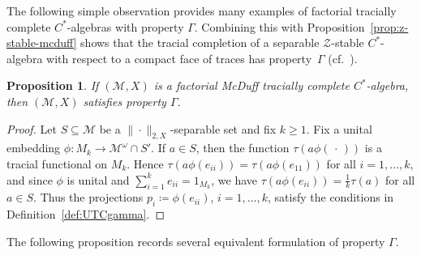 \documentclass[a4paper,11pt]{amsart}
\newtheorem{proposition}[theorem]{Proposition}
\theoremstyle{definition}
\numberwithin{equation}{section}
\numberwithin{theorem}{section}
\newcommand{\M}{\mathcal{M}}
\begin{document}
The following simple observation provides many examples of factorial tracially complete $C^*$-algebras with property $\Gamma$.  Combining this with Proposition~\ref{prop:z-stable-mcduff} shows that the tracial completion of a separable $\mathcal Z$-stable $C^*$-algebra with respect to a compact face of traces has  property~$\Gamma$ (cf.\ \cite[Proposition 2.3]{CETWW}).

\begin{proposition}\label{prop:McDuff-implies-Gamma}
If $(\M, X)$ is a factorial McDuff tracially complete $C^*$-algebra, then $(\M, X)$ satisfies property $\Gamma$.
\end{proposition}

\begin{proof}
Let $S \subseteq \M$ be a $\|\cdot\|_{2, X}$-separable set and fix $k \geq 1$.  Fix a unital embedding $\phi \colon M_k \rightarrow \M^\omega \cap S'$.  If $a \in S$, then the function $\tau(a\phi(\,\cdot\,))$ is a tracial functional on $M_k$.  Hence $\tau(a\phi(e_{ii})) = \tau(a\phi(e_{11}))$ for all $i = 1, \ldots, k$, and since $\phi$ is unital and $\sum_{i=1}^k e_{ii} = 1_{M_k}$, we have $\tau(a \phi(e_{ii})) = \frac1k \tau(a)$ for all $a \in S$.  Thus the projections $p_i \coloneqq \phi(e_{ii})$, $i = 1, \ldots, k$, satisfy the conditions in Definition~\ref{def:UTCgamma}.
\end{proof}

The following proposition records several equivalent formulation of property $\Gamma$.
\end{document}
